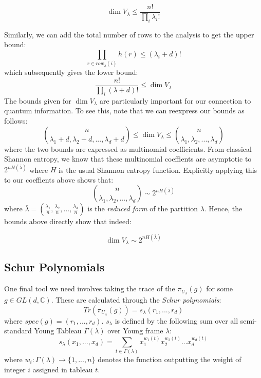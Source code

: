 \documentclass[12pt]{article}%
\begin{document}
\begin{equation}\label{vbound}
  \dim V_\lambda \leq \frac{n!}{\prod_i \lambda_i!}
\end{equation}

Similarly, we can add the total number of rows to the analysis to get the upper bound:
$$\prod_{r \in row_\lambda(i)} h(r) \leq (\lambda_i + d)!$$ which subsequently gives the lower bound:
$$ \frac{n!}{\prod_i (\lambda +d)!} \leq \dim V_{\lambda} $$
The bounds given for $\dim V_\lambda$ are particularly important for our connection to quantum information. To see this, note that we can reexpress our bounds as follows:
$${n \choose \lambda_1+d,\lambda_2+d,...,\lambda_d+d} \leq \dim V_{\lambda} \leq {n \choose \lambda_1,\lambda_2,...,\lambda_d} $$ where the two bounds are expressed as multinomial coefficients. From classical Shannon entropy, we know that these multinomial coeffients are asymptotic to $2^{nH(\bar{\lambda})}$ where $H$ is the usual Shannon entropy function. Explicitly applying this to our coeffients above shows that:
$$ {n \choose \lambda_1,\lambda_2,...,\lambda_d} \sim 2^{nH(\bar{\lambda})}$$
where $\bar{\lambda} = (\frac{\lambda_1}{n}, \frac{\lambda_2}{n},...,\frac{\lambda_d}{n})$ is the \textit{reduced form} of the partition $\lambda$. Hence, the bounds above directly show that indeed:

\begin{equation}
  \dim V_{\lambda} \sim 2^{nH(\bar{\lambda})}
\end{equation}

\subsection{Schur Polynomials}
One final tool we need involves taking the trace of the $\pi_{U_{\lambda}}(g)$ for some $g \in GL(d, \mathbb{C})$. These are calculated through the \textit{Schur polynomials}:
\begin{equation}\label{schurdef}
    Tr(\pi_{U_\lambda}(g)) = s_{\lambda}(r_1,...,r_d)
\end{equation}
where $spec(g) = (r_1,...,r_d)$. $s_\lambda$ is defined by the following sum over all semi-standard Young Tableau $\Gamma(\lambda)$ over Young frame $\lambda$:
\begin{equation}
  s_{\lambda}(x_1,...,x_d) = \sum_{t \in \Gamma(\lambda)} x_1^{w_1(t)}x_2^{w_2(t)}...x_d^{w_d(t)}
\end{equation}
where $w_i: \Gamma(\lambda) \rightarrow \{1,...,n\}$ denotes the function outputting the weight of integer $i$ assigned in tableau $t$. \newline
\end{document}
